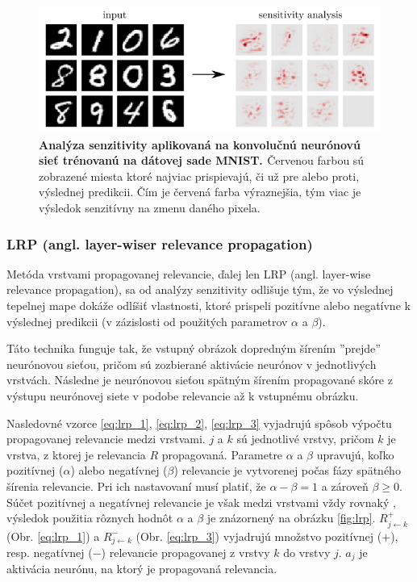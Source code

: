 \begin{figure}[h!]
\centering
\includegraphics[scale=0.5]{assets/images/sensitivity_analysis.png}
\caption{\textbf{Analýza senzitivity aplikovaná na konvolučnú neurónovú sieť trénovanú na dátovej sade MNIST. \cite{montavon2018methods}} Červenou farbou sú zobrazené miesta ktoré najviac prispievajú, či už pre alebo proti, výslednej predikcii. Čím je červená farba výraznejšia, tým viac je výsledok senzitívny na zmenu daného pixela.}
\label{fig:sensitivity_analysis}
\end{figure}

\subsubsection{LRP (angl. layer-wiser relevance propagation)}

Metóda vrstvami propagovanej relevancie, ďalej len LRP (angl. layer-wise relevance propagation), sa od analýzy senzitivity odlišuje tým, že vo výslednej tepelnej mape dokáže odlíšiť vlastnosti, ktoré prispeli pozitívne alebo negatívne k výslednej predikcii (v zázislosti od použitých parametrov $\alpha$ a $\beta$).

Táto technika funguje tak, že vstupný obrázok dopredným šírením ''prejde'' neurónovou sieťou, pričom sú zozbierané aktivácie neurónov v jednotlivých vrstvách. Následne je neurónovou sieťou spätným šírením propagované skóre z výstupu neurónovej siete v podobe relevancie až k vstupnému obrázku. 

Nasledovné vzorce \ref{eq:lrp_1}, \ref{eq:lrp_2}, \ref{eq:lrp_3} \cite{montavon2018methods} vyjadrujú spôsob výpočtu propagovanej relevancie medzi vrstvami. $j$ a $k$ sú jednotlivé vrstvy, pričom $k$ je vrstva, z ktorej je relevancia $R$ propagovaná. Parametre $\alpha$ a $\beta$ upravujú, koľko pozitívnej ($\alpha$) alebo negatívnej ($\beta$) relevancie je vytvorenej počas fázy spätného šírenia relevancie. Pri ich nastavovaní musí platiť, že $\alpha - \beta = 1$ a zároveň $\beta \geq 0$. Súčet pozitívnej a negatívnej relevancie je však medzi vrstvami vždy rovnaký \cite{montavon2018methods}, výsledok použitia rôznych hodnôt $\alpha$ a $\beta$ je znázornený na obrázku \ref{fig:lrp}. $R_{j\leftarrow k}^{+}$ (Obr. \ref{eq:lrp_1}) a $R_{j\leftarrow k}^{-}$ (Obr. \ref{eq:lrp_3}) vyjadrujú množstvo pozitívnej ($+$), resp. negatívnej ($-$) relevancie propagovanej z vrstvy $k$ do vrstvy $j$. $a_j$ je aktivácia neurónu, na ktorý je propagovaná relevancia.

